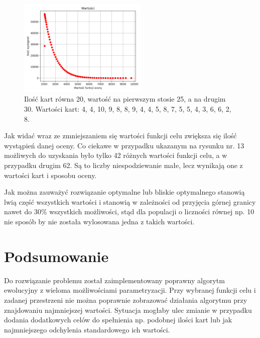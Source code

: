 \documentclass[12pt]{article}
\begin{document}
\begin{figure}[h]
	\centering					\includegraphics[width=0.55\textwidth]{2Values.png}
	\caption{Ilość kart równa 20, wartość na pierwszym stosie 25, a na drugim 30. Wartości kart: 4, 4, 10, 9, 8, 8, 9, 4, 4, 5, 8, 7, 5, 5, 4, 3, 6, 6, 2, 8.}
	\label{fig1}
\end{figure}


Jak widać wraz ze zmniejszaniem się wartości funkcji celu zwiększa się ilość wystąpień danej oceny. Co ciekawe w przypadku ukazanym na rysunku nr. 13 możliwych do uzyskania było tylko 42 różnych wartości funkcji celu, a w przypadku drugim 62. Są to liczby niespodziewanie małe, lecz wynikają one z wartości kart i sposobu oceny.  

Jak można zauważyć rozwiązanie optymalne lub bliskie optymalnego stanowią lwią część wszystkich wartości i stanowią w zależności od przyjęcia górnej granicy nawet do 30\% wszystkich możliwości, stąd dla populacji o liczności równej np. 10 nie sposób by nie została wylosowana jedna z takich wartości.  
 
\section{Podsumowanie}
Do rozwiązanie problemu został zaimplementowany poprawny algorytm ewolucyjny z wieloma możliwościami parametryzacji. Przy wybranej funkcji celu i zadanej przestrzeni nie można poprawnie zobrazować działania algorytmu przy znajdowaniu najmniejszej wartości. Sytuacja mogłaby ulec zmianie w przypadku dodania dodatkowych celów do spełnienia np. podobnej ilości kart lub jak najmniejszego odchylenia standardowego ich wartości.  
 
\end{document}
